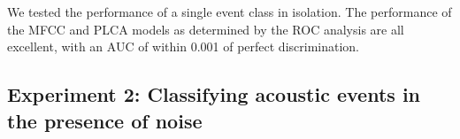 \documentclass[a4paper,10pt,final]{ThesisStyle}
\begin{document}
We tested the performance of a single event class in isolation.  The performance of the MFCC and PLCA models as determined by the ROC analysis are all excellent, with an AUC of within 0.001 of perfect discrimination.




\subsection{Experiment 2: Classifying acoustic events in the presence of noise}
\end{document}
